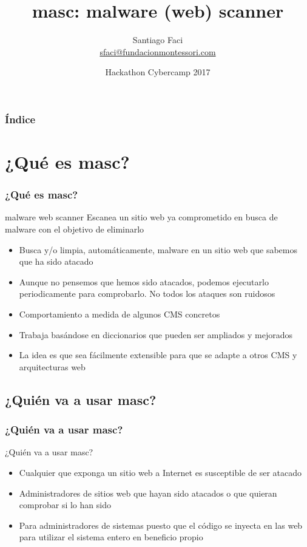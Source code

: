 \documentclass[xcolor={dvipsnames}]{beamer}
\begin{document}
\title{masc: malware (web) scanner}  
\author{Santiago Faci\\ \url{sfaci@fundacionmontessori.com}}
\date{\Large{Hackathon Cybercamp 2017}} 

\begin{frame}
\titlepage
\end{frame}

\begin{frame}[plain]\frametitle{Índice}\tableofcontents
\end{frame} 


\section{¿Qué es masc?} 
\begin{frame}\frametitle{¿Qué es masc?} 

    \begin{block}{malware web scanner}
    Escanea un sitio web ya comprometido en busca de malware con el objetivo de eliminarlo
    \end{block}

    \begin{itemize}
        \item Busca y/o limpia, automáticamente, malware en un sitio web que sabemos que ha sido atacado
        \item Aunque no pensemos que hemos sido atacados, podemos ejecutarlo periodicamente para comprobarlo. No todos los ataques son ruidosos
        \item Comportamiento a medida de algunos CMS concretos
        \item Trabaja basándose en diccionarios que pueden ser ampliados y mejorados
        \item La idea es que sea fácilmente extensible para que se adapte a otros CMS y arquitecturas web
    \end{itemize}
\end{frame}

\subsection{¿Quién va a usar masc?}
\begin{frame}\frametitle{¿Quién va a usar masc?}
    \begin{block}{¿Quién va a usar masc?}
        \begin{itemize}
            \item Cualquier que exponga un sitio web a Internet es susceptible de ser atacado
            \item Administradores de sitios web que hayan sido atacados o que quieran comprobar si lo han sido
            \item Para administradores de sistemas puesto que el código se inyecta en las web para utilizar el sistema entero en beneficio propio
        \end{itemize}
    \end{block}
\end{frame}
\end{document}
